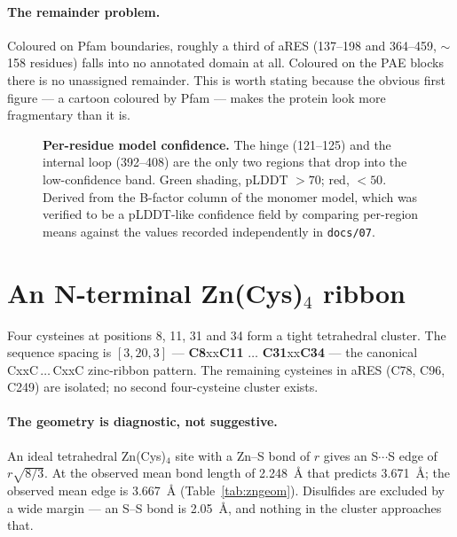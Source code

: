 \documentclass[11pt,a4paper]{article}
\begin{document}
\paragraph{The remainder problem.} Coloured on Pfam boundaries, roughly a third
of aRES (137--198 and 364--459, $\sim$158 residues) falls into no annotated
domain at all. Coloured on the PAE blocks there is no unassigned remainder. This
is worth stating because the obvious first figure --- a cartoon coloured by Pfam
--- makes the protein look more fragmentary than it is.

\begin{figure}[htbp]
\centering

\caption{\textbf{Per-residue model confidence.} The hinge (121--125) and the
internal loop (392--408) are the only two regions that drop into the
low-confidence band. Green shading, pLDDT $>70$; red, $<50$. Derived from the
B-factor column of the monomer model, which was verified to be a pLDDT-like
confidence field by comparing per-region means against the values recorded
independently in \texttt{docs/07}.}
\label{fig:plddt}
\end{figure}

\section{An N-terminal Zn(Cys)$_4$ ribbon}
\label{sec:zinc}

Four cysteines at positions 8, 11, 31 and 34 form a tight tetrahedral cluster.
The sequence spacing is $[3, 20, 3]$ --- \textbf{C8}xx\textbf{C11}
$\dots$ \textbf{C31}xx\textbf{C34} --- the canonical CxxC\,$\dots$\,CxxC
zinc-ribbon pattern. The remaining cysteines in aRES (C78, C96, C249) are
isolated; no second four-cysteine cluster exists.

\paragraph{The geometry is diagnostic, not suggestive.} An ideal tetrahedral
Zn(Cys)$_4$ site with a Zn--S bond of $r$ gives an S$\cdots$S edge of
$r\sqrt{8/3}$. At the observed mean bond length of \SI{2.248}{\angstrom} that
predicts \SI{3.671}{\angstrom}; the observed mean edge is
\SI{3.667}{\angstrom} (Table~\ref{tab:zngeom}). Disulfides are excluded by a
wide margin --- an S--S bond is \SI{2.05}{\angstrom}, and nothing in the cluster
approaches that.
\end{document}
